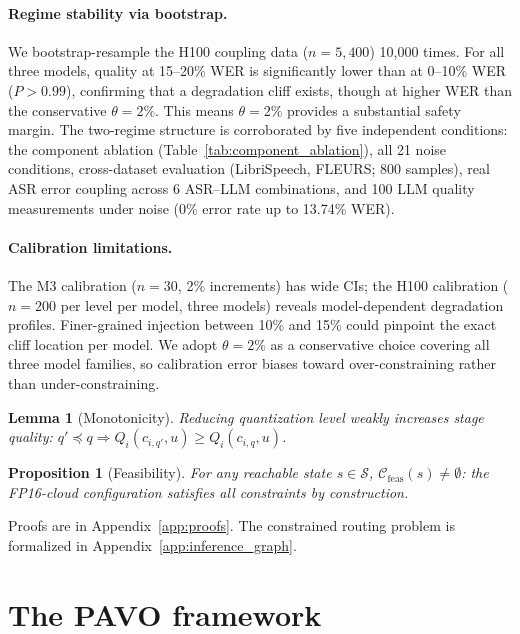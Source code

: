 \documentclass{article}
\newtheorem{proposition}[theorem]{Proposition}
\newtheorem{lemma}[theorem]{Lemma}
\begin{document}
\paragraph{Regime stability via bootstrap.}
We bootstrap-resample the H100 coupling data ($n=5{,}400$) 10{,}000 times. For all three models, quality at 15--20\% WER is significantly lower than at 0--10\% WER ($P > 0.99$), confirming that a degradation cliff exists, though at higher WER than the conservative $\theta=2\%$. This means $\theta=2\%$ provides a substantial safety margin. The two-regime structure is corroborated by five independent conditions: the component ablation (Table~\ref{tab:component_ablation}), all 21 noise conditions, cross-dataset evaluation (LibriSpeech, FLEURS; 800 samples), real ASR error coupling across 6 ASR--LLM combinations, and 100 LLM quality measurements under noise (0\% error rate up to 13.74\% WER).

\paragraph{Calibration limitations.} The M3 calibration ($n = 30$, 2\% increments) has wide CIs; the H100 calibration ($n=200$ per level per model, three models) reveals model-dependent degradation profiles. Finer-grained injection between 10\% and 15\% could pinpoint the exact cliff location per model. We adopt $\theta = 2\%$ as a conservative choice covering all three model families, so calibration error biases toward over-constraining rather than under-constraining.

\begin{lemma}[Monotonicity]
\label{lem:mono}
Reducing quantization level weakly increases stage quality: $q'\preceq q \Rightarrow Q_i(c_{i,q'},u)\geq Q_i(c_{i,q},u)$.
\end{lemma}

\begin{proposition}[Feasibility]
\label{prop:feasible}
For any reachable state $s\in\mathcal{S}$, $\mathcal{C}_{\mathrm{feas}}(s)\neq\emptyset$: the FP16-cloud configuration satisfies all constraints by construction.
\end{proposition}

Proofs are in Appendix~\ref{app:proofs}. The constrained routing problem is formalized in Appendix~\ref{app:inference_graph}.

\section{The PAVO framework}
\label{sec:arch}
\end{document}

